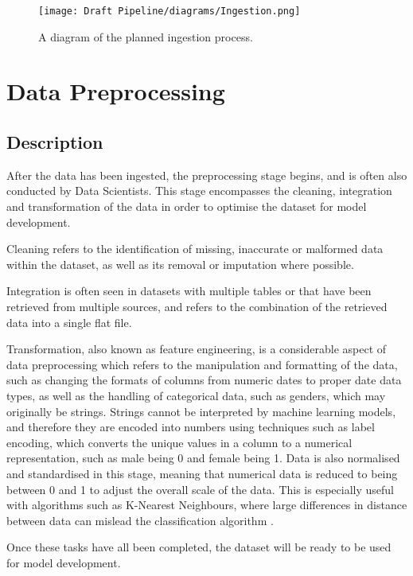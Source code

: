 \begin{figure}[H]
    \centering
    \texttt{[image: Draft Pipeline/diagrams/Ingestion.png]}
    \caption{A diagram of the planned ingestion process.}
    \label{fig:IngestionDiagram}
\end{figure}

\pagebreak %

\section{Data Preprocessing}\label{sec:Preprocessing}
\subsection{Description}
After the data has been ingested, the preprocessing stage begins, and is often also conducted by 
Data Scientists. This stage encompasses the
cleaning, integration and transformation of the data in order to optimise the dataset for model development.

Cleaning refers to the identification of missing, inaccurate or malformed data within the dataset,
as well as its removal or imputation where possible.

Integration is often seen in datasets with multiple tables or that have been retrieved from multiple sources,
and refers to the combination of the retrieved data into a single flat file. 

Transformation, also known as feature engineering, is a considerable aspect of data preprocessing
which refers to the manipulation and formatting of the data, such as changing the formats of columns 
from numeric dates to proper date data types, as well as the handling of categorical data, such as genders, 
which may originally be strings. Strings cannot be interpreted by machine learning models, and therefore they 
are encoded into numbers using techniques such as label encoding, which converts the unique values in a column
to a numerical representation, such as male being 0 and female being 1. Data is also normalised and standardised 
in this stage, meaning that numerical data is reduced to being between 0 and 1 to adjust the overall scale of the 
data. This is especially useful with algorithms such as K-Nearest Neighbours, where large differences in distance 
between data can mislead the classification algorithm \autocite{ibm_what_2021}.

Once these tasks have all been completed, the dataset will be ready to be used for model development.

